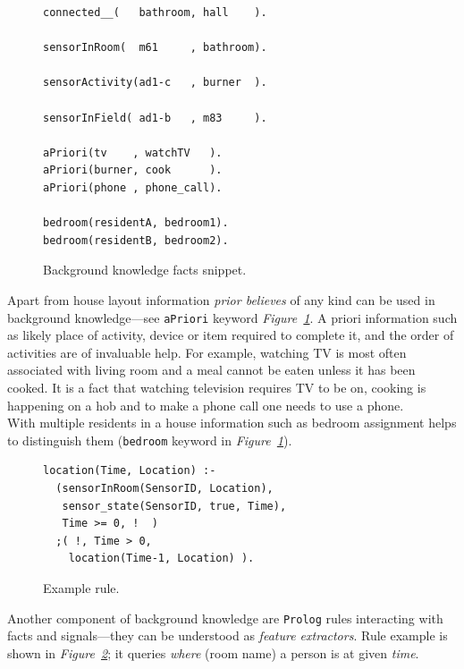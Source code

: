 \documentclass[10pt, a4paper, pdflatex, leqno, twoside, openright]{report}
\begin{document}
\begin{figure}[htb] %
  \begin{verbatim}
connected__(   bathroom, hall    ).

sensorInRoom(  m61     , bathroom).

sensorActivity(ad1-c   , burner  ).

sensorInField( ad1-b   , m83     ).

aPriori(tv    , watchTV   ).
aPriori(burner, cook      ).
aPriori(phone , phone_call).

bedroom(residentA, bedroom1).
bedroom(residentB, bedroom2).
  \end{verbatim}
  \caption{Background knowledge facts snippet.\label{lst:bg}}
\end{figure}

Apart from house layout information \emph{prior believes} of any kind can be used in background knowledge---see \texttt{aPriori} keyword \emph{Figure~\ref{lst:bg}}. A priori information such as likely place of activity, device or item required to complete it, and the order of activities are of invaluable help. For example, watching TV is most often associated with living room and a meal cannot be eaten unless it has been cooked. It is a fact that watching television requires TV to be on, cooking is happening on a hob and to make a phone call one needs to use a phone.\\
With multiple residents in a house information such as bedroom assignment helps to distinguish them (\texttt{bedroom} keyword in \emph{Figure~\ref{lst:bg}}).\\

\begin{figure}[htb] %
  \begin{verbatim}
location(Time, Location) :-
  (sensorInRoom(SensorID, Location),
   sensor_state(SensorID, true, Time),
   Time >= 0, !  )
  ;( !, Time > 0,
    location(Time-1, Location) ).
  \end{verbatim}
  \caption{Example rule.\label{lst:bg:rule}}
\end{figure}

Another component of background knowledge are \texttt{Prolog} rules interacting with facts and signals---they can be understood as \emph{feature extractors}. Rule example is shown in \emph{Figure~\ref{lst:bg:rule}}; it queries \emph{where} (room name) a person is at given \emph{time}.\\
\end{document}
